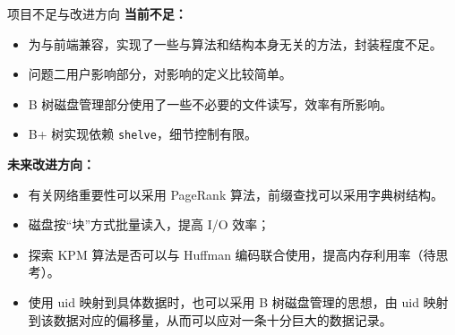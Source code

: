 \documentclass{beamer}
\begin{document}
\begin{frame}{项目不足与改进方向}
\textbf{当前不足：}
\begin{itemize}
  \item 为与前端兼容，实现了一些与算法和结构本身无关的方法，封装程度不足。
  \item 问题二用户影响部分，对影响的定义比较简单。
  \item B 树磁盘管理部分使用了一些不必要的文件读写，效率有所影响。
  \item B+ 树实现依赖 \texttt{shelve}，细节控制有限。
\end{itemize}

\vspace{0.5em}
\textbf{未来改进方向：}
\begin{itemize}
  \item 有关网络重要性可以采用 PageRank 算法，前缀查找可以采用字典树结构。
  \item 磁盘按“块”方式批量读入，提高 I/O 效率；
  \item 探索 KPM 算法是否可以与 Huffman 编码联合使用，提高内存利用率（待思考）。
  \item 使用 uid 映射到具体数据时，也可以采用 B 树磁盘管理的思想，由 uid 映射到该数据对应的偏移量，从而可以应对一条十分巨大的数据记录。
\end{itemize}
\end{frame}

\backmatter
\end{document}
